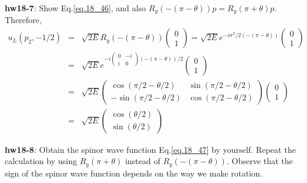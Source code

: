 \documentclass[12pt]{article}
\def\th{\theta}
\begin{document}
{\bf hw18-7}: Show Eq.\ref{eq.18_46}, and also $R_y(-(\pi-\theta))p = R_y(\pi+\theta) p$.
Therefore,
\begin{eqnarray}
    u_L(p_2,-1/2)
    &=& \sqrt{2E} R_y(-(\pi-\theta)) 
    \begin{pmatrix}
    0 \\ 1
    \end{pmatrix}
    =\sqrt{2E} e^{-i\sigma^2/2(-(\pi-\theta))}
    \begin{pmatrix}
        0 \\ 1
    \end{pmatrix} \\ 
    &=&\sqrt{2E} e^{-i
    \begin{pmatrix}
        0 & -i \\
        i & 0
    \end{pmatrix}
    (-(\pi-\theta))/2 }
    \begin{pmatrix}
        0 \\ 1
    \end{pmatrix} \\
    &=& \sqrt{2E}
    \begin{pmatrix}
        \cos(\pi/2-\th/2) & \sin(\pi/2-\th/2) \\
        -\sin(\pi/2-\th/2) &  \cos(\pi/2-\th/2)
    \end{pmatrix}
    \begin{pmatrix}
        0 \\ 1
    \end{pmatrix} \\
    &=& \sqrt{2E} 
    \begin{pmatrix}
        \cos(\theta/2) \\ \sin(\theta/2)
    \end{pmatrix} \label{eq.18_47}
\end{eqnarray}

{\bf hw18-8}: Obtain the spinor wave function Eq.\ref{eq.18_47} by yourself.  Repeat the calculation by using $R_y(\pi+\theta)$ instead of $R_y(-(\pi-\theta))$. Observe that the sign of the spinor wave function depends on the way
we make rotation.
\end{document}
